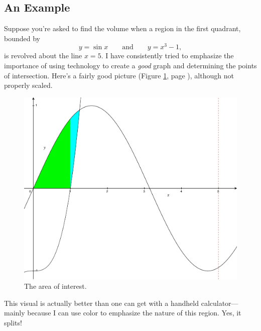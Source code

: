 \documentclass[12pt,addpoints, answers, fleqn]{exam}
\begin{document}
\subsection{An Example}
Suppose you're asked to find the volume when a region in the first quadrant, bounded by
\[
y = \sin x \qquad \mbox{and} \qquad y = x^3 -1,
\]
is revolved about the line $x=5$. I have consistently tried to emphasize the importance of using technology to create a \emph{good} graph and determining the points of intersection. Here's a fairly good picture (Figure \ref{fig:graph3203}, page \pageref{fig:graph3203}), although not properly scaled.
\begin{figure}[htbp] %
   \centering
   \includegraphics[width=5in]{./graphics/graph3203.pdf} 
   \caption{The area of interest.}
   \label{fig:graph3203}
\end{figure}
This visual is actually better than one can get with a handheld calculator---mainly because I can use color to emphasize the nature of this region. Yes, it splits!
\end{document}
